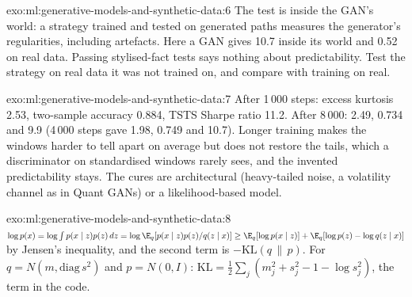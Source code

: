 \begin{solution}{exo:ml:generative-models-and-synthetic-data:6}
The test is inside the GAN's world: a strategy trained and tested on generated paths measures the generator's regularities,
including artefacts. Here a GAN gives 10.7 inside its world and 0.52 on real data. Passing stylised-fact tests says nothing
about predictability. Test the strategy on real data it was not trained on, and compare with training on real.
\end{solution}

\begin{solution}{exo:ml:generative-models-and-synthetic-data:7}
After 1\,000 steps: excess kurtosis 2.53, two-sample accuracy 0.884, TSTS Sharpe ratio 11.2. After 8\,000: 2.49, 0.734 and
9.9 (4\,000 steps gave 1.98, 0.749 and 10.7). Longer training makes the windows harder to tell apart on average but does
not restore the tails, which a discriminator on standardised windows rarely sees, and the invented predictability stays.
The cures are architectural (heavy-tailed noise, a volatility channel as in Quant GANs) or a likelihood-based model.
\end{solution}

\begin{solution}{exo:ml:generative-models-and-synthetic-data:8}
$\log p(x) = \log\int p(x\mid z)p(z)\,dz = \log\E_q[p(x\mid z)p(z)/q(z\mid x)]\ge\E_q[\log p(x\mid z)] + \E_q[\log p(z) -
\log q(z\mid x)]$ by Jensen's inequality, and the second term is $-\mathrm{KL}(q\,\|\,p)$. For $q = N(m, \mathrm{diag}\,
s^2)$ and $p = N(0, I)$: $\mathrm{KL} = \tfrac12\sum_j(m_j^2 + s_j^2 - 1 - \log s_j^2)$, the term in the code.
\end{solution}

